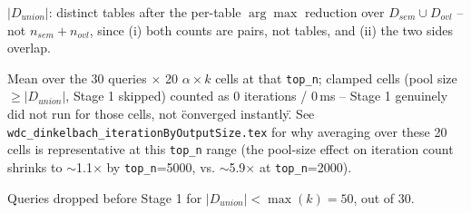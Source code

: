 \begin{table}[t]
\begin{threeparttable}
\begin{tablenotes}
\item[b] $|D_{union}|$: distinct tables after the per-table $\arg\max$ reduction over $D_{sem} \cup D_{ovl}$ -- not $n_{sem}+n_{ovl}$, since (i) both counts are pairs, not tables, and (ii) the two sides overlap.
\item[c] Mean over the 30 queries $\times$ 20 $\alpha{\times}k$ cells at that \texttt{top\_n}; clamped cells (pool size $\geq |D_{union}|$, Stage 1 skipped) counted as 0 iterations / 0\,ms -- Stage 1 genuinely did not run for those cells, not \"converged instantly\". See \texttt{wdc\_dinkelbach\_iterationByOutputSize.tex} for why averaging over these 20 cells is representative at this \texttt{top\_n} range (the pool-size effect on iteration count shrinks to $\sim$1.1$\times$ by \texttt{top\_n}=5000, vs. $\sim$5.9$\times$ at \texttt{top\_n}=2000).
\item[d] Queries dropped before Stage 1 for $|D_{union}| < \max(k) = 50$, out of 30.
\end{tablenotes}
\end{threeparttable}
\end{table}

